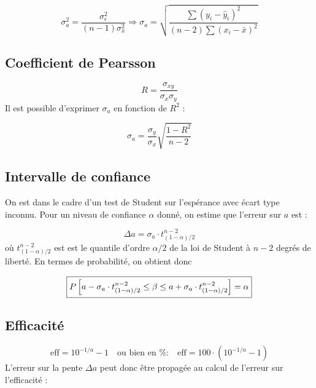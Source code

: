 \documentclass[a4paper,10pt]{article}
\begin{document}
\begin{equation}
 \sigma_a^2 = \dfrac{\sigma_{\epsilon}^2}{(n-1)\sigma_x^2} \Longrightarrow
\boxed{\sigma_a =
\sqrt{\dfrac{\sum(y_i-\hat{y}_i)^2}{
(n-2)\sum (x_i-\bar{x})^2}}}
\end{equation}

\subsection{Coefficient de Pearsson}

\begin{equation}
 R = \dfrac{\sigma_{xy}}{\sigma_x\sigma_y}
\end{equation}
Il est possible d'exprimer $\sigma_a$ en fonction de $R^2$ :

\begin{equation}
 \sigma_a = \dfrac{\sigma_y}{\sigma_x}\sqrt{\dfrac{1-R^2}{n-2}}
\end{equation}


\subsection{Intervalle de confiance}
On est dans le cadre d'un test de Student sur l'espérance avec écart type
inconnu. Pour un niveau de confiance $\alpha$ donné, on estime que l'erreur sur
$a$ est :

\begin{equation}
 \Delta a = \sigma _a \cdot t_{(1-\alpha)/2}^{n-2}
\end{equation}
où $t_{(1-\alpha)/2}^{n-2}$ est est le quantile d'ordre $\alpha/2$ de la loi de
Student à $n-2$ degrés de liberté. En termes de probabilité, on obtient donc

\begin{equation}
\boxed{%
 P\left[a- \sigma _a \cdot t_{(1-\alpha)/2}^{n-2}\le \beta\le a +\sigma _a \cdot
t_{(1-\alpha)/2}^{n-2}\right] = \alpha}
\end{equation}

\subsection{Efficacité}

\begin{equation}
 \text{eff} = 10^{-1/a}-1\quad \text{ou bien en \%:}\quad \text{eff}
=100\cdot\left(10^{-1/a}-1\right)
\end{equation}
L'erreur sur la pente $\Delta a$ peut donc être propagée au calcul de l'erreur
sur l'efficacité :
\end{document}
